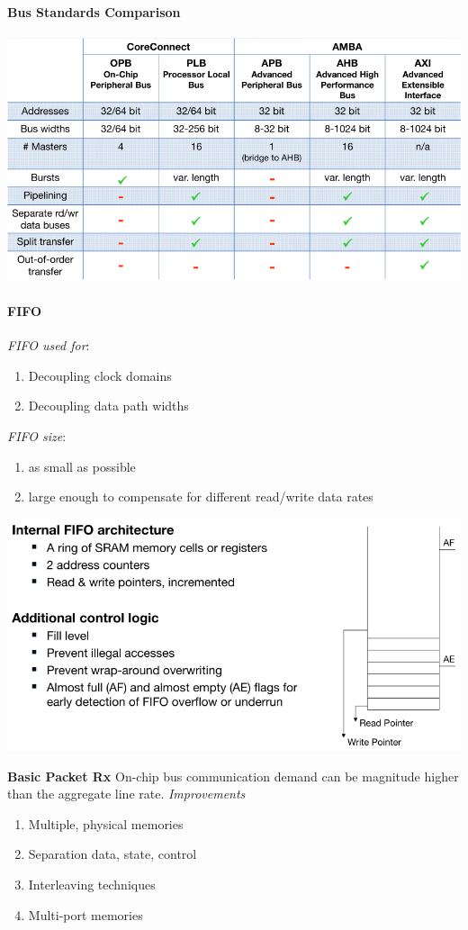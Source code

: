 \documentclass[english]{latex4ei/latex4ei_sheet}
\begin{document}
\paragraph{Bus Standards Comparison}
\begin{center}
    \includegraphics[width=0.75\linewidth]{images//6.Interconnects/BusComparison.png}
\end{center}


\paragraph{FIFO}

\textit{FIFO used for}:
\begin{enumerate}
    \item Decoupling clock domains
    \item Decoupling data path widths
\end{enumerate}
\textit{FIFO size}:
\begin{enumerate}
    \item as small as possible
    \item large enough to compensate for different read/write data rates
\end{enumerate}
\begin{center}
    \includegraphics[width=0.75\linewidth]{images//6.Interconnects/FIFO.png}
\end{center}

\textbf{Basic Packet Rx} On-chip bus communication demand can be magnitude higher than the aggregate line rate.
\textit{Improvements}
\begin{enumerate}
    \item Multiple, physical memories
    \item Separation data, state, control
    \item Interleaving techniques
    \item Multi-port memories
\end{enumerate}
\end{document}
